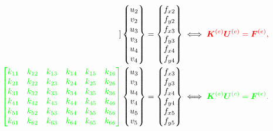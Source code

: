 \begin{align}
\begin{bmatrix}
    \end{bmatrix}
    \color{black}
    \begin{Bmatrix}
        u_2 \\ v_2 \\ u_3 \\ v_3 \\ u_4 \\ v_4
    \end{Bmatrix}
    &=
    \begin{Bmatrix}
        f_{x2} \\ f_{y2} \\ f_{x3} \\ f_{y3} \\ f_{x4} \\ f_{y4}
    \end{Bmatrix} \iff \color{red} \bm{K}^{(e)} \bm{U}^{(e)} = \bm{F}^{(e)}, \\
    \color{green} \begin{bmatrix}
        k_{11} & k_{12} & k_{13} & k_{14} & k_{15} & k_{16} \\
        k_{21} & k_{22} & k_{23} & k_{24} & k_{25} & k_{26} \\
        k_{31} & k_{32} & k_{33} & k_{34} & k_{35} & k_{36} \\
        k_{41} & k_{42} & k_{43} & k_{44} & k_{45} & k_{46} \\
        k_{51} & k_{52} & k_{53} & k_{54} & k_{55} & k_{56} \\
        k_{61} & k_{62} & k_{63} & k_{64} & k_{65} & k_{66} \\
    \end{bmatrix}
    \color{black}
    \begin{Bmatrix}
        u_3 \\ v_3 \\ u_4 \\ v_4 \\ u_5 \\ v_5
    \end{Bmatrix}
    &=
    \begin{Bmatrix}
        f_{x3} \\ f_{y3} \\ f_{x4} \\ f_{y4} \\ f_{x5} \\ f_{y5}
    \end{Bmatrix} \iff \color{green} \bm{K}^{(e)} \bm{U}^{(e)} = \bm{F}^{(e)}.
\end{align}

